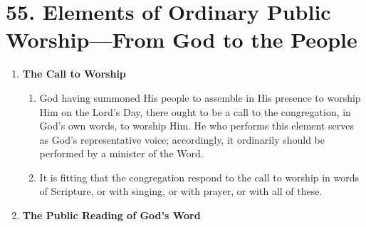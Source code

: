 \documentclass[
]{book}
\providecommand{\tightlist}{%
  \setlength{\itemsep}{0pt}\setlength{\parskip}{0pt}}
\begin{document}
\hypertarget{elements-of-ordinary-public-worshipfrom-god-to-the-people}{%
\section*{55. Elements of Ordinary Public Worship---From God to the People}\label{elements-of-ordinary-public-worshipfrom-god-to-the-people}}

\protect\hypertarget{chapter-slug-55-elements-of-ordinary-public-worship-from-god-to-the-people}{\href{}{}}

\begin{enumerate}
\def\labelenumi{\arabic{enumi}.}
\tightlist
\item
  \protect\hypertarget{55}{\href{}{}}\textbf{The Call to Worship}

  \begin{enumerate}
  \def\labelenumii{\alph{enumii}.}
  \tightlist
  \item
    God having summoned His people to assemble in His presence to worship Him on the Lord's Day, there ought to be a call to the congregation, in God's own words, to worship Him. He who performs this element serves as God's representative voice; accordingly, it ordinarily should be performed by a minister of the Word.
  \item
    It is fitting that the congregation respond to the call to worship in words of Scripture, or with singing, or with prayer, or with all of these.
  \end{enumerate}
\item
  \textbf{The Public Reading of God's Word}


\end{enumerate}
\end{document}
